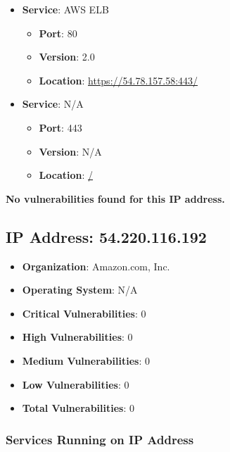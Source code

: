 \documentclass{article}
\begin{document}
\begin{itemize}
    
        \item \textbf{Service}: AWS ELB
        \begin{itemize}
            \item \textbf{Port}: 80
            \item \textbf{Version}:  2.0 
            \item \textbf{Location}: \href{ https://54.78.157.58:443/ }{ https://54.78.157.58:443/ }
        \end{itemize}
    
        \item \textbf{Service}: N/A
        \begin{itemize}
            \item \textbf{Port}: 443
            \item \textbf{Version}:  N/A 
            \item \textbf{Location}: \href{ / }{ / }
        \end{itemize}
    
\end{itemize}


\textbf{No vulnerabilities found for this IP address.}




\clearpage



\subsection*{IP Address: 54.220.116.192}

\begin{itemize}
    \item \textbf{Organization}: Amazon.com, Inc.
    \item \textbf{Operating System}:  N/A 
    \item \textbf{Critical Vulnerabilities}: 0
    \item \textbf{High Vulnerabilities}: 0
    \item \textbf{Medium Vulnerabilities}: 0
    \item \textbf{Low Vulnerabilities}: 0
    \item \textbf{Total Vulnerabilities}: 0
\end{itemize}

\subsubsection*{Services Running on IP Address}
\end{document}
